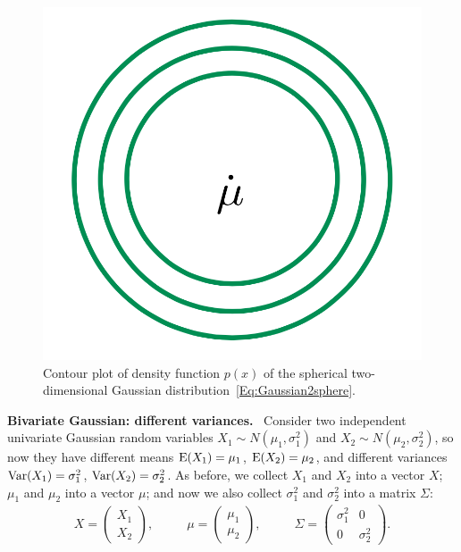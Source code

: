 \documentclass[11pt]{article}
\def\Ex#1{{\rm E}(#1)}
\def\Var#1{{\rm Var}(#1)}
\begin{document}
\begin{figure}[h!]
\centering
\includegraphics[scale=0.25]{sphericalGaussian}
\caption{Contour plot of density function $p(x)$ of the spherical two-dimensional Gaussian distribution~\eqref{Eq:Gaussian2sphere}.}
\label{fig:gaussian2sphere}
\end{figure}

\smallskip
{\bf Bivariate Gaussian: different variances.}~
Consider two independent univariate Gaussian random variables $X_1 \sim N(\mu_1, \sigma_1^2)$ and $X_2 \sim N(\mu_2, \sigma_2^2)$, so now they have different means $\Ex{X_1} = \mu_1$, $\Ex{X_2} = \mu_2$, and different variances $\Var{X_1} = \sigma_1^2$, $\Var{X_2} = \sigma_2^2$. As before, we collect $X_1$ and $X_2$ into a vector $X$; $\mu_1$ and $\mu_2$ into a vector $\mu$; and now we also collect $\sigma_1^2$ and $\sigma_2^2$ into a matrix $\Sigma$:
\begin{align*}
X = \begin{pmatrix} X_1 \\ X_2 \end{pmatrix}, ~~~~~~~~~~~~ \mu = \begin{pmatrix} \mu_1 \\ \mu_2 \end{pmatrix},
~~~~~~~~~~~~ \Sigma = \begin{pmatrix} \sigma_1^2 & 0 \\ 0 & \sigma_2^2 \end{pmatrix}.
\end{align*}
\end{document}
